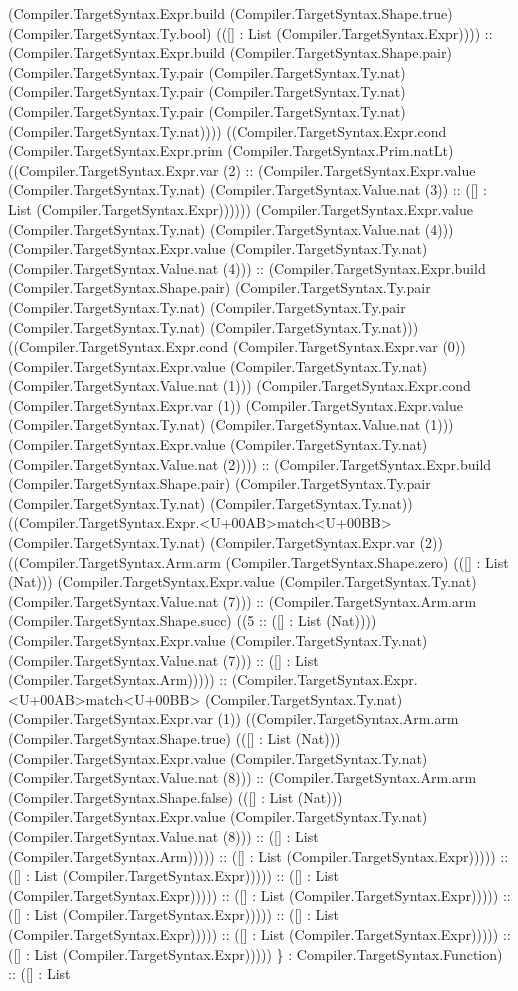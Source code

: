 \documentclass[11pt]{article}
\begin{document}
(Compiler.TargetSyntax.Expr.build (Compiler.TargetSyntax.Shape.true) (Compiler.TargetSyntax.Ty.bool) (([] : List (Compiler.TargetSyntax.Expr)))) :: (Compiler.TargetSyntax.Expr.build (Compiler.TargetSyntax.Shape.pair) (Compiler.TargetSyntax.Ty.pair (Compiler.TargetSyntax.Ty.nat) (Compiler.TargetSyntax.Ty.pair (Compiler.TargetSyntax.Ty.nat) (Compiler.TargetSyntax.Ty.pair (Compiler.TargetSyntax.Ty.nat) (Compiler.TargetSyntax.Ty.nat)))) ((Compiler.TargetSyntax.Expr.cond (Compiler.TargetSyntax.Expr.prim (Compiler.TargetSyntax.Prim.natLt) ((Compiler.TargetSyntax.Expr.var (2) :: (Compiler.TargetSyntax.Expr.value (Compiler.TargetSyntax.Ty.nat) (Compiler.TargetSyntax.Value.nat (3)) :: ([] : List (Compiler.TargetSyntax.Expr)))))) (Compiler.TargetSyntax.Expr.value (Compiler.TargetSyntax.Ty.nat) (Compiler.TargetSyntax.Value.nat (4))) (Compiler.TargetSyntax.Expr.value (Compiler.TargetSyntax.Ty.nat) (Compiler.TargetSyntax.Value.nat (4))) :: (Compiler.TargetSyntax.Expr.build (Compiler.TargetSyntax.Shape.pair) (Compiler.TargetSyntax.Ty.pair (Compiler.TargetSyntax.Ty.nat) (Compiler.TargetSyntax.Ty.pair (Compiler.TargetSyntax.Ty.nat) (Compiler.TargetSyntax.Ty.nat))) ((Compiler.TargetSyntax.Expr.cond (Compiler.TargetSyntax.Expr.var (0)) (Compiler.TargetSyntax.Expr.value (Compiler.TargetSyntax.Ty.nat) (Compiler.TargetSyntax.Value.nat (1))) (Compiler.TargetSyntax.Expr.cond (Compiler.TargetSyntax.Expr.var (1)) (Compiler.TargetSyntax.Expr.value (Compiler.TargetSyntax.Ty.nat) (Compiler.TargetSyntax.Value.nat (1))) (Compiler.TargetSyntax.Expr.value (Compiler.TargetSyntax.Ty.nat) (Compiler.TargetSyntax.Value.nat (2)))) :: (Compiler.TargetSyntax.Expr.build (Compiler.TargetSyntax.Shape.pair) (Compiler.TargetSyntax.Ty.pair (Compiler.TargetSyntax.Ty.nat) (Compiler.TargetSyntax.Ty.nat)) ((Compiler.TargetSyntax.Expr.<U+00AB>match<U+00BB> (Compiler.TargetSyntax.Ty.nat) (Compiler.TargetSyntax.Expr.var (2)) ((Compiler.TargetSyntax.Arm.arm (Compiler.TargetSyntax.Shape.zero) (([] : List (Nat))) (Compiler.TargetSyntax.Expr.value (Compiler.TargetSyntax.Ty.nat) (Compiler.TargetSyntax.Value.nat (7))) :: (Compiler.TargetSyntax.Arm.arm (Compiler.TargetSyntax.Shape.succ) ((5 :: ([] : List (Nat)))) (Compiler.TargetSyntax.Expr.value (Compiler.TargetSyntax.Ty.nat) (Compiler.TargetSyntax.Value.nat (7))) :: ([] : List (Compiler.TargetSyntax.Arm))))) :: (Compiler.TargetSyntax.Expr.<U+00AB>match<U+00BB> (Compiler.TargetSyntax.Ty.nat) (Compiler.TargetSyntax.Expr.var (1)) ((Compiler.TargetSyntax.Arm.arm (Compiler.TargetSyntax.Shape.true) (([] : List (Nat))) (Compiler.TargetSyntax.Expr.value (Compiler.TargetSyntax.Ty.nat) (Compiler.TargetSyntax.Value.nat (8))) :: (Compiler.TargetSyntax.Arm.arm (Compiler.TargetSyntax.Shape.false) (([] : List (Nat))) (Compiler.TargetSyntax.Expr.value (Compiler.TargetSyntax.Ty.nat) (Compiler.TargetSyntax.Value.nat (8))) :: ([] : List (Compiler.TargetSyntax.Arm))))) :: ([] : List (Compiler.TargetSyntax.Expr))))) :: ([] : List (Compiler.TargetSyntax.Expr))))) :: ([] : List (Compiler.TargetSyntax.Expr))))) :: ([] : List (Compiler.TargetSyntax.Expr))))) :: ([] : List (Compiler.TargetSyntax.Expr))))) :: ([] : List (Compiler.TargetSyntax.Expr))))) :: ([] : List (Compiler.TargetSyntax.Expr))))) :: ([] : List (Compiler.TargetSyntax.Expr))))) \} : Compiler.TargetSyntax.Function) :: ([] : List 
\end{document}
